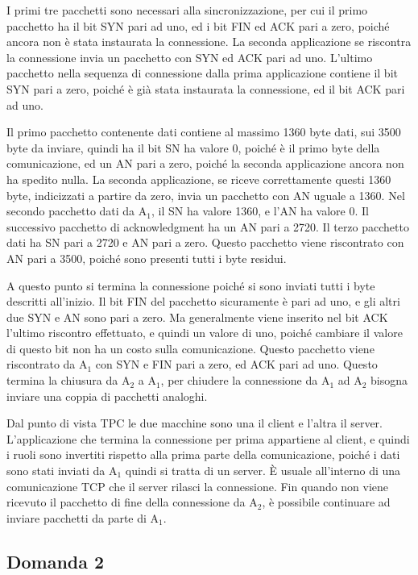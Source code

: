 \documentclass{article}
\numberwithin{equation}{subsection}
\begin{document}
I primi tre pacchetti sono necessari alla sincronizzazione, per cui il primo pacchetto ha il bit SYN pari ad uno, ed i bit FIN ed ACK pari a zero, poiché ancora non è 
stata instaurata la connessione. La seconda applicazione se riscontra la connessione invia un pacchetto con SYN ed ACK pari ad uno. L'ultimo pacchetto nella 
sequenza di connessione dalla prima applicazione contiene il bit SYN pari a zero, poiché è già stata instaurata la connessione, ed il bit ACK pari ad uno. 

Il primo pacchetto contenente dati contiene al massimo 1360 byte dati, sui 3500 byte da inviare, quindi ha il bit SN ha valore 0, poiché è il primo byte della 
comunicazione, ed un AN pari a zero, poiché la seconda applicazione ancora non ha spedito nulla. La seconda applicazione, se riceve correttamente questi 1360 byte, 
indicizzati a partire da zero, invia un pacchetto con AN uguale a 1360. Nel secondo pacchetto dati da A$_1$, il SN ha valore 1360, e l'AN ha valore 0. 
Il successivo pacchetto di acknowledgment ha un AN pari a 2720. Il terzo pacchetto dati ha SN pari a 2720 e AN pari a zero. Questo pacchetto viene riscontrato con 
AN pari a 3500, poiché sono presenti tutti i byte residui.  

A questo punto si termina la connessione poiché si sono inviati tutti i byte descritti all'inizio. Il bit FIN del pacchetto sicuramente è pari ad uno, e gli altri due SYN e 
AN sono pari a zero. Ma generalmente viene inserito nel bit ACK l'ultimo riscontro effettuato, e quindi un valore di uno, poiché cambiare il valore di questo bit non ha 
un costo sulla comunicazione. Questo pacchetto viene riscontrato da A$_1$ con SYN e FIN pari a zero, ed ACK pari ad uno. 
Questo termina la chiusura da A$_2$ a A$_1$, per chiudere la connessione da A$_1$ ad A$_2$ bisogna inviare una coppia di pacchetti analoghi. 

Dal punto di vista TPC le due macchine sono una il client e l'altra il server. L'applicazione che termina la connessione per prima appartiene al client, e quindi 
i ruoli sono invertiti rispetto alla prima parte della comunicazione, poiché i dati sono stati inviati da A$_1$ quindi si tratta di un server. \`{E} usuale all'interno 
di una comunicazione TCP che il server rilasci la connessione. Fin quando non viene ricevuto il pacchetto di fine della connessione da A$_2$, è possibile continuare ad 
inviare pacchetti da parte di A$_1$. 

\subsection*{Domanda 2}
\end{document}
